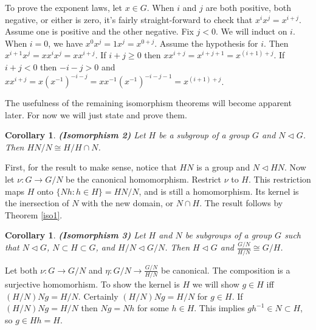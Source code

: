 \documentclass[letterpaper]{article}
\newtheorem{corollary}[theorem]{Corollary}
\newenvironment{proof}[1][Proof]{\begin{trivlist}
\item[\hskip \labelsep {\bfseries #1}]}{\end{trivlist}}
\begin{document}
To prove the exponent laws, let $x \in G$. When $i$ and $j$ are both positive, both negative, or either is zero, it's fairly straight-forward to check that $x^ix^j = x^{i+j}$. Assume one is positive and the other negative. Fix $j < 0$. We will induct on $i$. When $i = 0$, we have $x^0x^j = 1x^j = x^{0+j}$. Assume the hypothesis for $i$. Then $x^{i+1}x^j = xx^ix^j = xx^{i+j}$. If $i + j \geq 0$ then $xx^{i+j} = x^{i+j+1} = x^{(i+1)+j}$. If $i + j < 0$ then $-i -j > 0$ and $xx^{i+j} = x(x^{-1})^{-i - j} = xx^{-1}(x^{-1})^{-i -j -1} = x^{(i+1) + j}$.

The usefulness of the remaining isomorphism theorems will become apparent later. For now we will just state and prove them.

\begin{corollary}
\label{iso2}
\emph{\textbf{(Isomorphism 2)}}
Let $H$ be a subgroup of a group $G$ and $N \lhd G$.  Then $HN/N \cong H/{H \cap N}$.
\end{corollary}
\begin{proof}
First, for the result to make sense, notice that $HN$ is a group and $N \lhd HN$.  Now let $\nu \colon G \rightarrow G/N$ be the canonical homomorphism. Restrict $\nu$ to $H$. This restriction maps $H$ onto $\{Nh \colon h \in H\} = HN/N$, and is still a homomorphism. Its kernel is the inersection of $N$ with the new domain, or $N \cap H$. The result follows by Theorem \ref{iso1}.
\end{proof}

\begin{corollary}
\label{iso3}
\emph{\textbf{(Isomorphism 3)}}
Let $H$ and $N$ be subgroups of a group $G$ such that $N \lhd G$, $N \subset H \subset G$, and $H/N \lhd G/N$. Then $H \lhd G$ and $\frac{G/N}{H/N} \cong G/H$.
\end{corollary}
\begin{proof}
Let both $\nu \colon G \rightarrow G/N$ and $\eta \colon G/N \rightarrow \frac{G/N}{H/N}$ be canonical. The composition is a surjective homomorhism. To show the kernel is $H$ we will show $g \in H$ iff $(H/N)Ng = H/N$. Certainly $(H/N)Ng = H/N$ for $g \in H$. If $(H/N)Ng = H/N$ then $Ng = Nh$ for some $h \in H$. This implies $gh^{-1} \in N \subset H$, so $g \in Hh = H$.
\end{proof}
\end{document}

